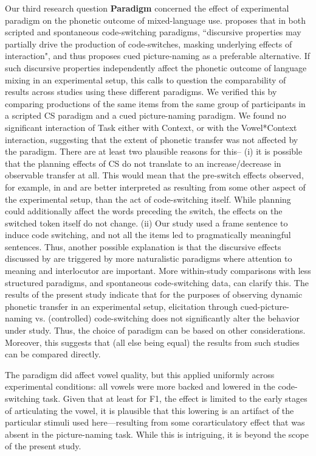 \documentclass[12 pt]{article}
\begin{document}
Our third research question \textbf{Paradigm} concerned the effect of experimental paradigm on the phonetic outcome of mixed-language use. \cite{olson2013bilingual} proposes that in both scripted and spontaneous code-switching paradigms, ``discursive properties may partially drive the production of code-switches, masking underlying effects of interaction", and thus proposes cued picture-naming as a preferable alternative. If such discursive properties independently affect the phonetic outcome of language mixing in an experimental setup, this calls to question the comparability of results across studies using these different paradigms. We verified this by comparing productions of the same items from the same group of participants in a scripted CS paradigm and a cued picture-naming paradigm. We found no significant interaction of Task either with Context, or with the Vowel*Context interaction, suggesting that the extent of phonetic transfer was not affected by the paradigm. 
There are at least two plausible reasons for this-- (i) it is possible that the planning effects of CS do not translate to an increase/decrease in observable transfer at all. This would mean that the pre-switch effects observed, for example, in \cite{muldner2019phonetics} and \cite{bullock2009trying} are better interpreted as resulting from some other aspect of the experimental setup, than the act of code-switching itself. While planning could additionally affect the words preceding the switch, the effects on the switched token itself do not change. (ii) Our study used a frame sentence to induce code switching, and not all the items led to pragmatically meaningful sentences. Thus, another possible explanation is that the discursive effects discussed by \cite{olson2013bilingual} are triggered by more naturalistic paradigms where attention to meaning and interlocutor are important. More within-study comparisons with less structured paradigms, and spontaneous code-switching data, can clarify this. The results of the present study indicate that for the purposes of observing dynamic phonetic transfer in an experimental setup, elicitation through cued-picture-naming vs. (controlled) code-switching does not significantly alter the behavior under study. Thus, the choice of paradigm can be based on other considerations. Moreover, this suggests that (all else being equal) the results from such studies can be compared directly. 

The paradigm did affect vowel quality, but this applied uniformly across experimental conditions: all vowels were more backed and lowered in the code-switching task. Given that at least for F1, the effect is limited to the early stages of articulating the vowel, it is plausible that this lowering is an artifact of the particular stimuli used here---resulting from some corarticulatory effect that was absent in the picture-naming task. While this is intriguing, it is beyond the scope of the present study.  \\
\end{document}
